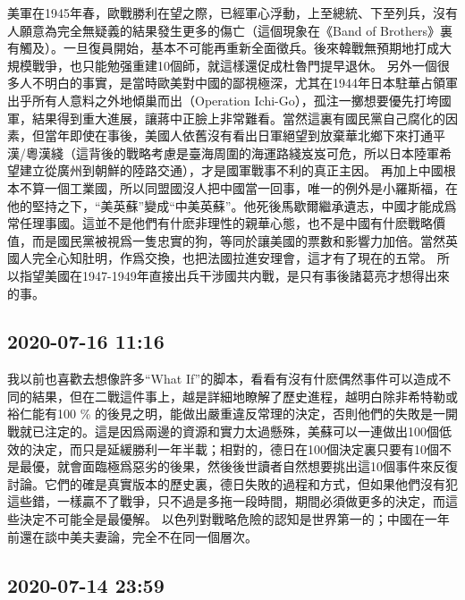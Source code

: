 \documentclass[twocolumn]{ctexart}
\begin{document}
美軍在1945年春，歐戰勝利在望之際，已經軍心浮動，上至總統、下至列兵，沒有人願意為完全無疑義的結果發生更多的傷亡（這個現象在《Band of Brothers》裏有觸及）。一旦復員開始，基本不可能再重新全面徵兵。後來韓戰無預期地打成大規模戰爭，也只能勉强重建10個師，就這樣還促成杜魯門提早退休。
另外一個很多人不明白的事實，是當時歐美對中國的鄙視極深，尤其在1944年日本駐華占領軍出乎所有人意料之外地傾巢而出（Operation Ichi-Go），孤注一擲想要優先打垮國軍，結果得到重大進展，讓蔣中正臉上非常難看。當然這裏有國民黨自己腐化的因素，但當年即使在事後，美國人依舊沒有看出日軍絕望到放棄華北鄉下來打通平漢/粵漢綫（這背後的戰略考慮是臺海周圍的海運路綫岌岌可危，所以日本陸軍希望建立從廣州到朝鮮的陸路交通），才是國軍戰事不利的真正主因。
再加上中國根本不算一個工業國，所以同盟國沒人把中國當一回事，唯一的例外是小羅斯福，在他的堅持之下，“美英蘇”變成“中美英蘇”。他死後馬歇爾繼承遺志，中國才能成爲常任理事國。這並不是他們有什麽非理性的親華心態，也不是中國有什麽戰略價值，而是國民黨被視爲一隻忠實的狗，等同於讓美國的票數和影響力加倍。當然英國人完全心知肚明，作爲交換，也把法國拉進安理會，這才有了現在的五常。
所以指望美國在1947-1949年直接出兵干涉國共内戰，是只有事後諸葛亮才想得出來的事。
\subsection*{2020-07-16 11:16}

我以前也喜歡去想像許多“What If”的脚本，看看有沒有什麽偶然事件可以造成不同的結果，但在二戰這件事上，越是詳細地瞭解了歷史進程，越明白除非希特勒或裕仁能有100 \% 的後見之明，能做出嚴重違反常理的決定，否則他們的失敗是一開戰就已注定的。這是因爲兩邊的資源和實力太過懸殊，美蘇可以一連做出100個低效的決定，而只是延緩勝利一年半載；相對的，德日在100個決定裏只要有10個不是最優，就會面臨極爲惡劣的後果，然後後世讀者自然想要挑出這10個事件來反復討論。它們的確是真實版本的歷史裏，德日失敗的過程和方式，但如果他們沒有犯這些錯，一樣贏不了戰爭，只不過是多拖一段時間，期間必須做更多的決定，而這些決定不可能全是最優解。
以色列對戰略危險的認知是世界第一的；中國在一年前還在談中美夫妻論，完全不在同一個層次。
\subsection*{2020-07-14 23:59}
\end{document}

